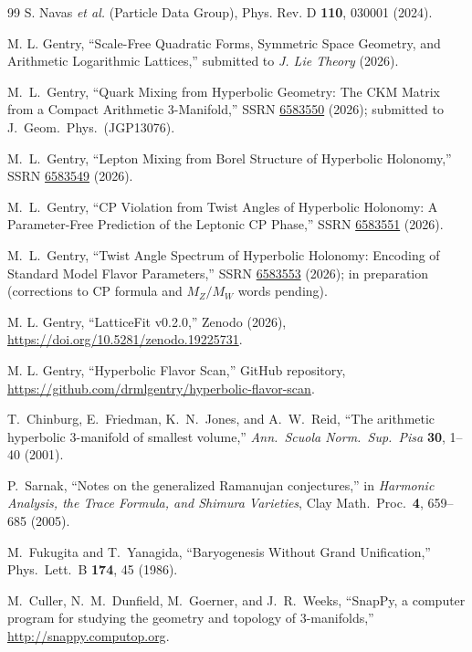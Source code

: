 ﻿\documentclass[12pt]{article}
\theoremstyle{definition}
\begin{document}
\begin{thebibliography}{99}
  S. Navas \textit{et al.} (Particle Data Group),
  Phys. Rev. D \textbf{110}, 030001 (2024).

  M. L. Gentry,
  ``Scale-Free Quadratic Forms, Symmetric Space Geometry, and Arithmetic Logarithmic Lattices,''
  submitted to \textit{J. Lie Theory} (2026).

  M.~L.~Gentry,
  ``Quark Mixing from Hyperbolic Geometry: The CKM Matrix from a Compact Arithmetic 3-Manifold,''
  SSRN \href{https://doi.org/10.2139/ssrn.6583550}{6583550} (2026);
  submitted to J.\ Geom.\ Phys.\ (JGP13076).

  M.~L.~Gentry,
  ``Lepton Mixing from Borel Structure of Hyperbolic Holonomy,''
  SSRN \href{https://doi.org/10.2139/ssrn.6583549}{6583549} (2026).

  M.~L.~Gentry,
  ``CP Violation from Twist Angles of Hyperbolic Holonomy:
  A Parameter-Free Prediction of the Leptonic CP Phase,''
  SSRN \href{https://doi.org/10.2139/ssrn.6583551}{6583551} (2026).

  M.~L.~Gentry,
  ``Twist Angle Spectrum of Hyperbolic Holonomy:
  Encoding of Standard Model Flavor Parameters,''
  SSRN \href{https://doi.org/10.2139/ssrn.6583553}{6583553} (2026);
  in preparation (corrections to CP formula and $M_Z/M_W$ words pending).

  M. L. Gentry,
  ``LatticeFit v0.2.0,''
  Zenodo (2026), \url{https://doi.org/10.5281/zenodo.19225731}.

  M. L. Gentry,
  ``Hyperbolic Flavor Scan,''
  GitHub repository, \url{https://github.com/drmlgentry/hyperbolic-flavor-scan}.

  T.~Chinburg, E.~Friedman, K.~N.~Jones, and A.~W.~Reid,
  ``The arithmetic hyperbolic 3-manifold of smallest volume,''
  \emph{Ann.\ Scuola Norm.\ Sup.\ Pisa} \textbf{30}, 1--40 (2001).

  P.~Sarnak,
  ``Notes on the generalized Ramanujan conjectures,''
  in \emph{Harmonic Analysis, the Trace Formula, and Shimura Varieties},
  Clay Math.\ Proc.\ \textbf{4}, 659--685 (2005).

  M.~Fukugita and T.~Yanagida,
  ``Baryogenesis Without Grand Unification,''
  Phys.\ Lett.\ B \textbf{174}, 45 (1986).

  M.~Culler, N.~M.~Dunfield, M.~Goerner, and J.~R.~Weeks,
  ``SnapPy, a computer program for studying the geometry and topology of 3-manifolds,''
  \url{http://snappy.computop.org}.


\end{thebibliography}
\end{document}
